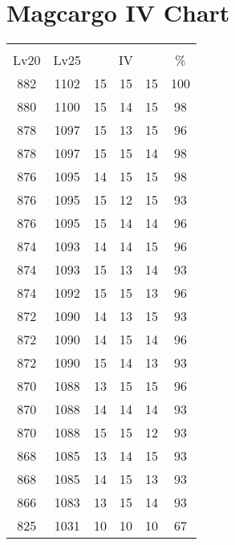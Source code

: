 \documentclass{article}%
\begin{document}
%
\normalsize%
\section{Magcargo IV Chart}%
\label{sec:Magcargo IV Chart}%
\renewcommand{\arraystretch}{1.5}%
\begin{tabular}{|c|c|c|c|c|c|}%
\hline%
\multicolumn{6}{|c|}{\textcolor{white}{ 
\linebreak{Magcargo}
}%
\cellcolor{black}}\\%
\multicolumn{1}{|c}{Lv20}&\multicolumn{1}{c|}{Lv25}&\multicolumn{3}{c|}{IV}&\multicolumn{1}{|c|}{\%}\\%
\hline%
\rowcolor{color100}%
882&1102&15&15&15&100\\%
\hline%
\rowcolor{color98}%
880&1100&15&14&15&98\\%
\hline%
\rowcolor{color96}%
878&1097&15&13&15&96\\%
\hline%
\rowcolor{color98}%
878&1097&15&15&14&98\\%
\hline%
\rowcolor{color98}%
876&1095&14&15&15&98\\%
\hline%
\rowcolor{color93}%
876&1095&15&12&15&93\\%
\hline%
\rowcolor{color96}%
876&1095&15&14&14&96\\%
\hline%
\rowcolor{color96}%
874&1093&14&14&15&96\\%
\hline%
\rowcolor{color93}%
874&1093&15&13&14&93\\%
\hline%
\rowcolor{color96}%
874&1092&15&15&13&96\\%
\hline%
\rowcolor{color93}%
872&1090&14&13&15&93\\%
\hline%
\rowcolor{color96}%
872&1090&14&15&14&96\\%
\hline%
\rowcolor{color93}%
872&1090&15&14&13&93\\%
\hline%
\rowcolor{color96}%
870&1088&13&15&15&96\\%
\hline%
\rowcolor{color93}%
870&1088&14&14&14&93\\%
\hline%
\rowcolor{color93}%
870&1088&15&15&12&93\\%
\hline%
\rowcolor{color93}%
868&1085&13&14&15&93\\%
\hline%
\rowcolor{color93}%
868&1085&14&15&13&93\\%
\hline%
\rowcolor{color93}%
866&1083&13&15&14&93\\%
\hline%
\rowcolor{color91}%
825&1031&10&10&10&67\\%
\end{tabular}

%
\end{document}
